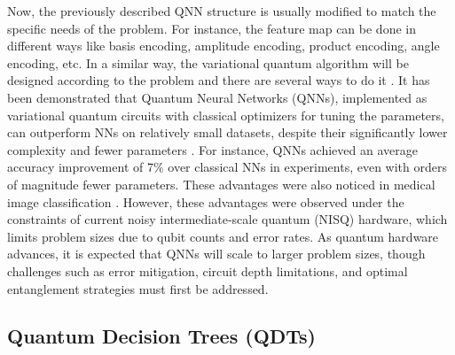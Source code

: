 \documentclass{article}
\begin{document}
Now, the previously described QNN structure is usually modified to match the specific needs of the problem. 
For instance, the feature map can be done in different ways like basis encoding, amplitude encoding, product encoding, angle encoding, etc. 
In a similar way, the variational quantum algorithm will be designed according to the problem and there are several ways to do it \cite{9528698}.
It has been demonstrated that Quantum Neural Networks (QNNs), implemented as variational quantum circuits with classical optimizers
for tuning the parameters, can outperform NNs on relatively small datasets, despite their significantly 
lower complexity and fewer parameters \cite{10015720}. For instance, QNNs achieved an average accuracy improvement of 7\% over 
classical NNs in experiments, even with orders of magnitude fewer parameters.
These advantages were also noticed in medical image classification \cite{10613907, 9293291}. 
However, these advantages were observed under the constraints of current noisy intermediate-scale quantum (NISQ) hardware, which limits problem
sizes due to qubit counts and error rates. As quantum hardware advances, it is expected that QNNs will scale to larger problem sizes, though 
challenges such as error mitigation, circuit depth limitations, and optimal entanglement strategies must first be addressed.


\subsection*{Quantum Decision Trees (QDTs)}
\end{document}
